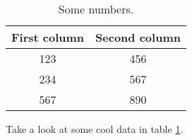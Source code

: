 
  \begin{table}[h]
    \begin{tabular}{c c} \toprule
      First column & Second column \\ \toprule
      123 & 456 \\
      234 & 567 \\
      567 & 890  \\
    \end{tabular}
    \caption{Some numbers.}
    \label{table:1}
  \end{table}

  Take a look at some cool data in table \ref{table:1}.


